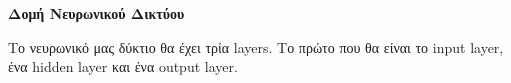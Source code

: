 \documentclass[a4paper,12pt]{article}
\begin{document}
\fancyfoot[C]{\thepage}  

\renewcommand{\sectionmark}[1]{\markright{\thesection\ #1}}




\section*{}
\begin{center}
    \Large \textbf{Δομή Νευρωνικού Δικτύου}
\end{center}

Το νευρωνικό μας δύκτιο θα έχει τρία layers. Το πρώτο που θα είναι το input layer, ένα hidden layer και ένα output layer.
\end{document}
